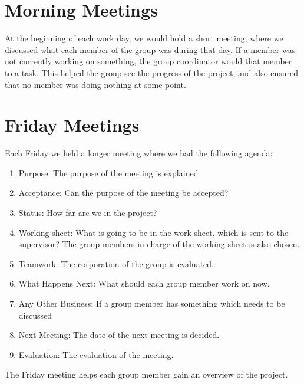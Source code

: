 \section{Morning Meetings}
At the beginning of each work day, we would hold a short meeting, where we discussed what each member of the group was during that day. If a member was not currently working on something, the group coordinator would that member to a task. This helped the group see the progress of the project, and also ensured that no member was doing nothing at some point.

\section{Friday Meetings}
Each Friday we held a longer meeting where we had the following agenda:

\begin{enumerate}
	\item Purpose: The purpose of the meeting is explained
	\item Acceptance: Can the purpose of the meeting be accepted? 
	\item Status: How far are we in the project?
	\item Working sheet: What is going to be in the work sheet, which is sent to the supervisor? The group members in charge of the working sheet is also chosen. 
	\item Teamwork: The corporation of the group is evaluated.  
	\item What Happens Next: What should each group member work on now.
	\item Any Other Business: If a group member has something which needs to be discussed
	\item Next Meeting: The date of the next meeting is decided. 
	\item Evaluation:  The evaluation of the meeting. 
\end{enumerate}

The Friday meeting helps each group member gain an overview of the project.